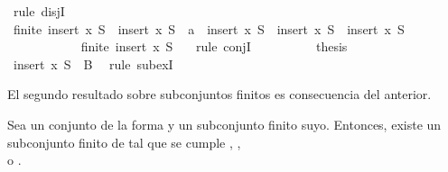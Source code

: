 \begin{isabellebody}
\ {\isacharparenleft}rule\ disjI{}{\isacharparenright}\isanewline
\ \ \ \ \ \ \ \ \isamarkupfalse%
\ {\isachardoublequoteopen}finite\ {\isacharparenleft}insert\ x\ S{\isacharprime}{\isacharparenright}\ {\isasymand}\ {\isacharparenleft}insert\ x\ S\ {\isacharequal}\ {\isacharbraceleft}a{\isacharbraceright}\ {\isasymunion}\ {\isacharparenleft}insert\ x\ S{\isacharprime}{\isacharparenright}\ {\isasymor}\ insert\ x\ S\ {\isacharequal}\ insert\ x\ S{\isacharprime}{\isacharparenright}{\isachardoublequoteclose}\isanewline
\ \ \ \ \ \ \ \ \ \ \isamarkupfalse%
\ {\isacartoucheopen}finite\ {\isacharparenleft}insert\ x\ S{\isacharprime}{\isacharparenright}{\isacartoucheclose}\ {}\ \isamarkupfalse%
\ {\isacharparenleft}rule\ conjI{\isacharparenright}\isanewline
\ \ \ \ \ \ \ \ \isamarkupfalse%
\ {\isacharquery}thesis\isanewline
\ \ \ \ \ \ \ \ \ \ \isamarkupfalse%
\ {\isacartoucheopen}insert\ x\ S{\isacharprime}\ {\isasymsubseteq}\ B{\isacartoucheclose}\ \isamarkupfalse%
\ {\isacharparenleft}rule\ subexI{\isacharparenright}\isanewline
\ \ \ \ \ \ \isamarkupfalse%
\isanewline
\ \ \ \ \isamarkupfalse%
\isanewline
\ \ \isamarkupfalse%
\isanewline
{}\isamarkupfalse%
%
\endisatagproof
{\isafoldproof}%
%
\isadelimproof
%
\endisadelimproof
%
\begin{isamarkuptext}%
El segundo resultado sobre subconjuntos finitos es consecuencia del anterior.

\begin{lema}
  Sea un conjunto de la forma  y  un subconjunto finito suyo. Entonces, existe un
  subconjunto finito  de  tal que se cumple , ,\\  
  o .
\end{lema}


\end{isamarkuptext}
\end{isabellebody}
